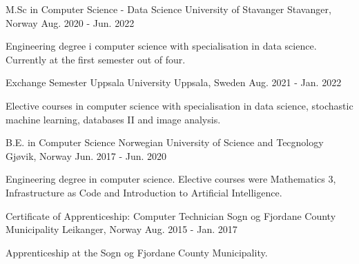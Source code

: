

\begin{cventries}

  \cventry
    {M.Sc in Computer Science - Data Science} %
    {University of Stavanger} %
    {Stavanger, Norway} %
    {Aug. 2020 - Jun. 2022} %
    {
      \begin{cvitems} %
        \item {Engineering degree i computer science with specialisation in data science. Currently at the first semester out of four.}
      \end{cvitems}
    }

  \cventry
    {Exchange Semester} %
    {Uppsala University} %
    {Uppsala, Sweden} %
    {Aug. 2021 - Jan. 2022} %
    {
      \begin{cvitems} %
        \item {Elective courses in computer science with specialisation in data science, stochastic machine learning, databases II and image analysis.}
      \end{cvitems}
    }


  \cventry
    {B.E. in Computer Science} %
    {Norwegian University of Science and Tecgnology} %
    {Gjøvik, Norway} %
    {Jun. 2017 - Jun. 2020} %
    {
      \begin{cvitems} %
        \item {Engineering degree in computer science. Elective courses were Mathematics 3, Infrastructure as Code and Introduction to Artificial Intelligence.}
      \end{cvitems}
    }

  \cventry
    {Certificate of Apprenticeship: Computer Technician} %
    {Sogn og Fjordane County Municipality} %
    {Leikanger, Norway} %
    {Aug. 2015 - Jan. 2017} %
    {
      \begin{cvitems} %
        \item {Apprenticeship at the Sogn og Fjordane County Municipality.}
      \end{cvitems}
    }

\end{cventries}
